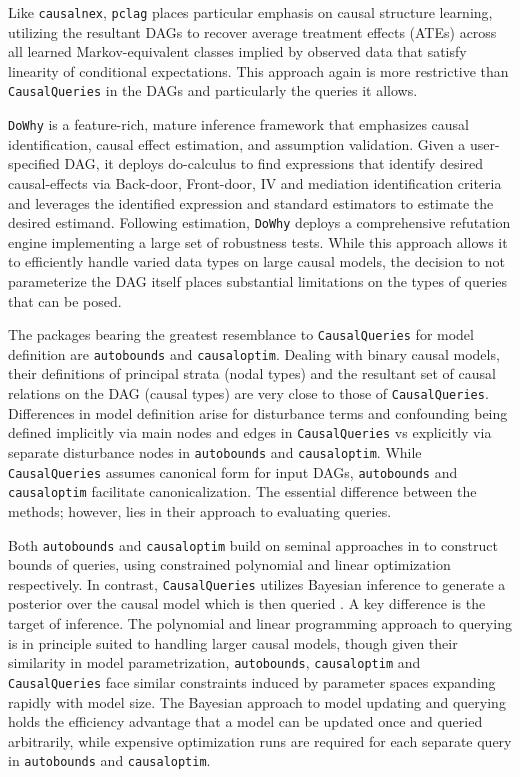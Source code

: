 \documentclass[
  11pt,
  article]{jss}
\begin{document}
Like \texttt{causalnex}, \texttt{pclag} places particular emphasis on
causal structure learning, utilizing the resultant DAGs to recover
average treatment effects (ATEs) across all learned Markov-equivalent
classes implied by observed data that satisfy linearity of conditional
expectations. This approach again is more restrictive than
\texttt{CausalQueries} in the DAGs and particularly the queries it
allows.

\texttt{DoWhy} is a feature-rich, mature inference framework that
emphasizes causal identification, causal effect estimation, and
assumption validation. Given a user-specified DAG, it deploys
do-calculus to find expressions that identify desired causal-effects via
Back-door, Front-door, IV and mediation identification criteria and
leverages the identified expression and standard estimators to estimate
the desired estimand. Following estimation, \texttt{DoWhy} deploys a
comprehensive refutation engine implementing a large set of robustness
tests. While this approach allows it to efficiently handle varied data
types on large causal models, the decision to not parameterize the DAG
itself places substantial limitations on the types of queries that can
be posed.

The packages bearing the greatest resemblance to \texttt{CausalQueries}
for model definition are \texttt{autobounds} and \texttt{causaloptim}.
Dealing with binary causal models, their definitions of principal strata
(nodal types) and the resultant set of causal relations on the DAG
(causal types) are very close to those of \texttt{CausalQueries}.
Differences in model definition arise for disturbance terms and
confounding being defined implicitly via main nodes and edges in
\texttt{CausalQueries} vs explicitly via separate disturbance nodes in
\texttt{autobounds} and \texttt{causaloptim}. While
\texttt{CausalQueries} assumes canonical form for input DAGs,
\texttt{autobounds} and \texttt{causaloptim} facilitate
canonicalization. The essential difference between the methods; however,
lies in their approach to evaluating queries.

Both \texttt{autobounds} and \texttt{causaloptim} build on seminal
approaches in \citet{balke_bounds_1997} to construct bounds of queries,
using constrained polynomial and linear optimization respectively. In
contrast, \texttt{CausalQueries} utilizes Bayesian inference to generate
a posterior over the causal model which is then queried
\citep[consistent
with][]{chickering_clinicians_1996, zhang_partial_2022}. A key
difference is the target of inference. The polynomial and linear
programming approach to querying is in principle suited to handling
larger causal models, though given their similarity in model
parametrization, \texttt{autobounds}, \texttt{causaloptim} and
\texttt{CausalQueries} face similar constraints induced by parameter
spaces expanding rapidly with model size. The Bayesian approach to model
updating and querying holds the efficiency advantage that a model can be
updated once and queried arbitrarily, while expensive optimization runs
are required for each separate query in \texttt{autobounds} and
\texttt{causaloptim}.
\end{document}
